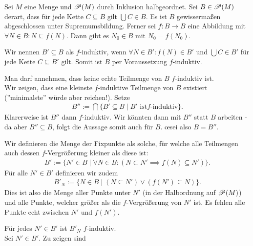 \documentclass[../../main.tex]{subfiles}
\begin{document}
\begin{lem}\label{12.2.6} 
	Sei $M$ eine Menge und $\mathcal P(M)$ durch Inklusion halbgeordnet. Sei $B\in\mathcal P(M)$ derart, dass für jede Kette $C\subseteq B$ gilt $\bigcup C\in B$. Es ist $B$ gewissermaßen abgeschlossen unter Supremumsbildung. Ferner sei $f: B\rightarrow B$ eine Abbildung mit $\forall N\in B: N\subseteq f(N)$. Dann gibt es $N_0\in B$ mit $N_0=f(N_0)$.
\end{lem}
\begin{cproof}
	Wir nennen $B'\subseteq B$ als $f$-induktiv, wenn $\forall N\in B': f(N)\in B'$ und $\bigcup C\in B'$ für jede Kette $C\subseteq B'$ gilt. Somit ist $B$ per Voraussetzung $f$-induktiv.\\	
	\begin{tcolorbox}[arc=0mm, boxrule=0.2mm]
			Man darf annehmen, dass keine echte Teilmenge von $B$ $f$-induktiv ist. \\
			Wir zeigen, dass eine kleinste $f$-induktive Teilmenge von $B$ existiert (''minimalste'' würde aber reichen!). Setze
			\begin{align*}
				B'':=\bigcap\{B'\subseteq B\mid B'\text{ ist}f\text{-induktiv}\}.
			\end{align*}
			Klarerweise ist $B''$ dann $f$-induktiv. Wir könnten dann mit $B''$ statt $B$ arbeiten - da aber $B''\subseteq B$, folgt die Aussage somit auch für $B$. \oe sei also $B=B''$.
	\end{tcolorbox}
	\noindent Wir definieren die Menge der Fixpunkte als  solche, für welche alle Teilmengen auch dessen $f$-Vergrößerung kleiner als diese ist:
	\begin{align*}
		B':=\{N'\in B\mid \forall N\in B: (N\subset N'\implies f(N)\subseteq N')\}.
	\end{align*}
	Für alle $N'\in B'$ definieren wir zudem
	\begin{align*}
		B'_N:=\{N\in B\mid(N\subseteq N')\lor(f(N')\subseteq N)\}.
	\end{align*}
	Dies ist also die Menge aller Punkte unter $N'$ (in der Halbordnung auf $\mathcal P(M)$) und alle Punkte, welcher größer als die $f$-Vergrößerung von $N'$ ist. Es fehlen alle Punkte echt zwischen $N'$ und $f(N')$.
	\begin{tcolorbox}[arc=0mm, boxrule=0.2mm]
			Für jedes $N'\in B'$ ist $B'_N$ $f$-induktiv. \\
			Sei $N'\in B'$. Zu zeigen sind
			\begin{enumerate}[\normalfont(b)]

\end{enumerate}
\end{tcolorbox}
\end{cproof}
\end{document}
